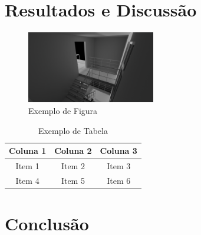 \documentclass[12pt,a4paper,brazil]{abntex2}
\begin{document}
\chapter{Resultados e Discussão}
\lipsum[10]

\begin{figure}[ht]
\centering
\includegraphics[width=0.5\textwidth]{untitled.png}
\caption{Exemplo de Figura}
\label{fig:exemplo}
\end{figure}

\begin{table}[ht]
\centering
\begin{tabular}{|c|c|c|}
\hline
Coluna 1 & Coluna 2 & Coluna 3 \\ \hline
Item 1   & Item 2   & Item 3   \\ \hline
Item 4   & Item 5   & Item 6   \\ \hline
\end{tabular}
\caption{Exemplo de Tabela}
\label{tab:exemplo}
\end{table}

\chapter{Conclusão}
\lipsum[11-12]


\end{document}
